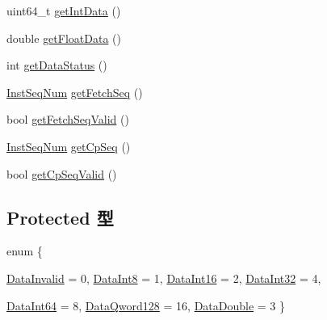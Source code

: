 \begin{DoxyCompactItemize}
\item 
uint64\_\-t \hyperlink{classTrace_1_1InstRecord_ae64285f17ee91d2af93d8647ea477cce}{getIntData} ()
\item 
double \hyperlink{classTrace_1_1InstRecord_ad194b29fe5b192977fb9cc84adf44050}{getFloatData} ()
\item 
int \hyperlink{classTrace_1_1InstRecord_a5f37948bfe45778a6154090fc6766eba}{getDataStatus} ()
\item 
\hyperlink{inst__seq_8hh_a258d93d98edaedee089435c19ea2ea2e}{InstSeqNum} \hyperlink{classTrace_1_1InstRecord_ad4b52e28ffe9d9f3e15571874cb504b4}{getFetchSeq} ()
\item 
bool \hyperlink{classTrace_1_1InstRecord_a2ec98e2af6b633b58a3b6c828d072932}{getFetchSeqValid} ()
\item 
\hyperlink{inst__seq_8hh_a258d93d98edaedee089435c19ea2ea2e}{InstSeqNum} \hyperlink{classTrace_1_1InstRecord_ac68bd758b2af5c8e1da868c7d5a6c82d}{getCpSeq} ()
\item 
bool \hyperlink{classTrace_1_1InstRecord_a43ac6a4f0772ea2c874e27eaf6dd2e2a}{getCpSeqValid} ()
\end{DoxyCompactItemize}
\subsection*{Protected 型}
\begin{DoxyCompactItemize}
\item 
enum \{ \par
\hyperlink{classTrace_1_1InstRecord_abe974f22edeef8189603ba75fd90ff3caf76cdd91e8bce9dc76f5f11e584dcad1}{DataInvalid} =  0, 
\hyperlink{classTrace_1_1InstRecord_abe974f22edeef8189603ba75fd90ff3ca0228004c8c680553fe8dc5be674bbbbe}{DataInt8} =  1, 
\hyperlink{classTrace_1_1InstRecord_abe974f22edeef8189603ba75fd90ff3ca7901167fe00bdc0750ec04a6ce793d91}{DataInt16} =  2, 
\hyperlink{classTrace_1_1InstRecord_abe974f22edeef8189603ba75fd90ff3ca35d6fae90449267821834a06fab1b54d}{DataInt32} =  4, 
\par
\hyperlink{classTrace_1_1InstRecord_abe974f22edeef8189603ba75fd90ff3ca2bc61b9bf4d308895d6e9ca4599ea59f}{DataInt64} =  8, 
\hyperlink{classTrace_1_1InstRecord_abe974f22edeef8189603ba75fd90ff3ca637bf6e6d7ba7b96c66bdeb3ffe53795}{DataQword128} =  16, 
\hyperlink{classTrace_1_1InstRecord_abe974f22edeef8189603ba75fd90ff3ca6e3a5b8477fbcecbbfc303d377bc41da}{DataDouble} =  3
 \}
\end{DoxyCompactItemize}
